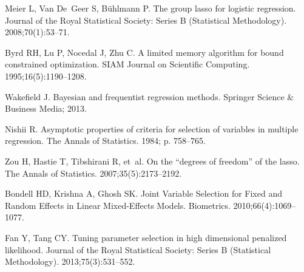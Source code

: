 \documentclass[10pt,letterpaper]{article}
\begin{document}
\begin{thebibliography}{10}
	Meier L, Van De~Geer S, B{\"u}hlmann P.
	\newblock The group lasso for logistic regression.
	\newblock Journal of the Royal Statistical Society: Series B (Statistical
	Methodology). 2008;70(1):53--71.

	Byrd RH, Lu P, Nocedal J, Zhu C.
	\newblock A limited memory algorithm for bound constrained optimization.
	\newblock SIAM Journal on Scientific Computing. 1995;16(5):1190--1208.

	Wakefield J.
	\newblock Bayesian and frequentist regression methods.
	\newblock Springer Science \& Business Media; 2013.

	Nishii R.
	\newblock Asymptotic properties of criteria for selection of variables in
	multiple regression.
	\newblock The Annals of Statistics. 1984; p. 758--765.

	Zou H, Hastie T, Tibshirani R, et~al.
	\newblock On the “degrees of freedom” of the lasso.
	\newblock The Annals of Statistics. 2007;35(5):2173--2192.

	Bondell HD, Krishna A, Ghosh SK.
	\newblock Joint Variable Selection for Fixed and Random Effects in Linear
	Mixed-Effects Models.
	\newblock Biometrics. 2010;66(4):1069--1077.

	Fan Y, Tang CY.
	\newblock Tuning parameter selection in high dimensional penalized likelihood.
	\newblock Journal of the Royal Statistical Society: Series B (Statistical
	Methodology). 2013;75(3):531--552.

\end{thebibliography}
\end{document}

